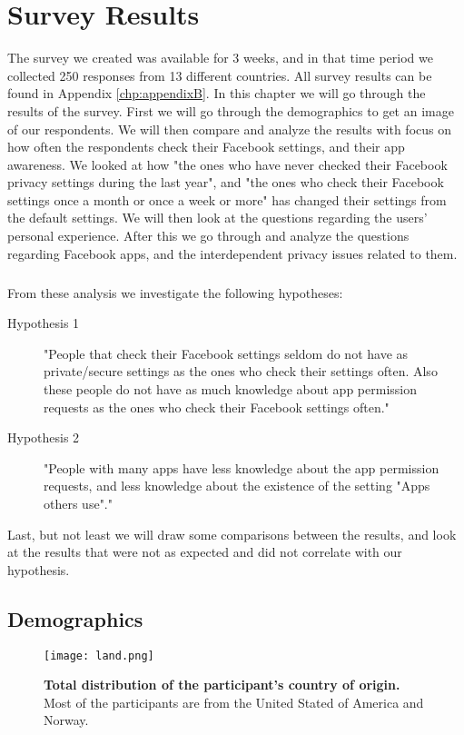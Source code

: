 \chapter{Survey Results}
\label{chp:surveyresults} 

The survey we created was available for 3 weeks, and in that time period we collected 250 responses from 13 different countries. All survey results can be found in Appendix \ref{chp:appendixB}. In this chapter we will go through the results of the survey. First we will go through the demographics to get an image of our respondents. We will then compare and analyze the results with focus on how often the respondents check their Facebook settings, and their app awareness. We looked at how "the ones who have never checked their Facebook privacy settings during the last year", and "the ones who check their Facebook settings once a month or once a week or more" has changed their settings from the default settings. We will then look at the questions regarding the users' personal experience. After this we go through and analyze the questions regarding Facebook apps, and the interdependent privacy issues related to them. 

\paragraph{}
From these analysis we investigate the following hypotheses: 
\begin{description}
\item [Hypothesis 1] "People that check their Facebook settings seldom do not have as private/secure settings as the ones who check their settings often. Also these people do not have as much knowledge about app permission requests as the ones who check their Facebook settings often."
\item [Hypothesis 2] "People with many apps have less knowledge about the app permission requests, and less knowledge about the existence of the setting "Apps others use"."
\end{description}

Last, but not least we will draw some comparisons between the results, and look at the results that were not as expected and did not correlate with our hypothesis. 

\section{Demographics}

\begin{figure}[h!]
\centering
\texttt{[image: land.png]}
\caption[Total distribution of the participant's country of origin]{\textbf{Total distribution of the participant's country of origin.} Most of the participants are from the United Stated of America and Norway.} 
\label{fig:land}
\end{figure}



